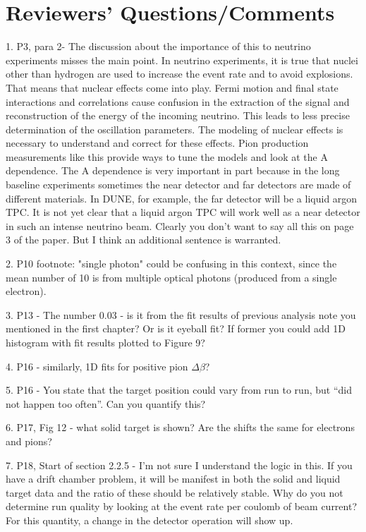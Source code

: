 \documentclass[12pt]{article}
\begin{document}
\section{Reviewers’ Questions/Comments}
1.
P3, para 2- The discussion about the importance of this to neutrino experiments misses the 
main point.  In neutrino experiments, it is true that nuclei other than hydrogen are used to 
increase the event rate and to avoid explosions.  That means that nuclear effects come into 
play.  Fermi motion and final state interactions and correlations cause confusion in the 
extraction of the signal and reconstruction of the energy of the incoming neutrino.  This 
leads to less precise determination of the oscillation parameters.  The modeling of nuclear 
effects is necessary to understand and correct for these effects.  Pion production 
measurements like this provide ways to tune the models and look at the A dependence.  The 
A dependence is very important in part because in the long baseline experiments sometimes 
the near detector and far detectors are made of different materials.  In DUNE, for example, 
the far detector will be a liquid argon TPC.  It is not yet clear that a liquid argon TPC will 
work well as a near detector in such an intense neutrino beam.  Clearly you don’t want to 
say all this on page 3 of the paper.  But I think an additional sentence is warranted.




2.
P10 footnote: "single photon" could be confusing in this context, since the mean number of 
10 is from multiple optical photons (produced from a single electron).



3.
P13 - The number 0.03 - is it from the fit results of previous analysis note you mentioned in 
the first chapter? Or is it eyeball fit? If former you could add 1D histogram with fit results 
plotted to Figure 9?



4.
P16 - similarly, 1D fits for positive pion $\Delta\beta$?



5.
P16 - You state that the target position could vary from run to run, but “did not happen too 
often”.  Can you quantify this?  



6.
P17, Fig 12 - what solid target is shown?  Are the shifts the same for electrons and pions?



7.
P18, Start of section 2.2.5 - I’m not sure I understand the logic in this.  If you have a drift 
chamber problem, it will be manifest in both the solid and liquid target data and the ratio of 
these should be relatively stable.  Why do you not determine run quality by looking at the 
event rate per coulomb of beam current?  For this quantity, a change in the detector 
operation will show up.
\end{document}
